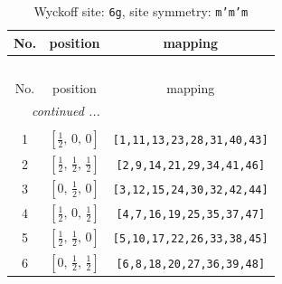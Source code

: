 \documentclass[fleqn,8pt]{jsarticle}
\begin{document}
\renewcommand{\arraystretch}{1.2}
\begin{longtable}{ccc}
\caption{Wyckoff site: {\tt 6g}, site symmetry: {\tt m'm'm}}
 \\
 \hline \hline
No. & position & mapping \\ \hline \endfirsthead

\multicolumn{2}{l}{\tablename\ \thetable{}} \\
 \hline \hline
No. & position & mapping \\ \hline \endhead

 \hline \hline
\multicolumn{2}{r}{\footnotesize\it continued ...} \\ \endfoot

 \hline \hline
\multicolumn{2}{r}{} \\ \endlastfoot

1 & $\left[ \frac{1}{2},\, 0,\, 0 \right]$ & {\tt [1,11,13,23,28,31,40,43]} \\ \hline
2 & $\left[ \frac{1}{2},\, \frac{1}{2},\, \frac{1}{2} \right]$ & {\tt [2,9,14,21,29,34,41,46]} \\ \hline
3 & $\left[ 0,\, \frac{1}{2},\, 0 \right]$ & {\tt [3,12,15,24,30,32,42,44]} \\ \hline
4 & $\left[ \frac{1}{2},\, 0,\, \frac{1}{2} \right]$ & {\tt [4,7,16,19,25,35,37,47]} \\ \hline
5 & $\left[ \frac{1}{2},\, \frac{1}{2},\, 0 \right]$ & {\tt [5,10,17,22,26,33,38,45]} \\ \hline
6 & $\left[ 0,\, \frac{1}{2},\, \frac{1}{2} \right]$ & {\tt [6,8,18,20,27,36,39,48]} \\
\end{longtable}
\renewcommand{\arraystretch}{1.2}
\end{document}

